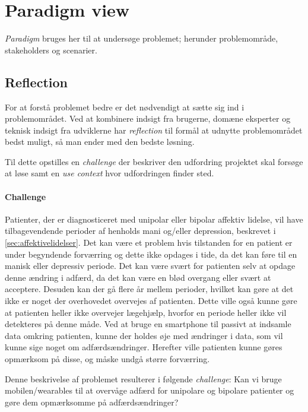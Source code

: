 

\section{Paradigm view}
\textit{Paradigm} bruges her til at undersøge problemet; herunder problemområde, stakeholders og scenarier.

\subsection{Reflection}
For at forstå problemet bedre er det nødvendigt at sætte sig ind i problemområdet.
Ved at kombinere indsigt fra brugerne, domæne eksperter og teknisk indsigt fra udviklerne har \emph{reflection} til formål at udnytte problemområdet bedst muligt, så man ender med den bedste løsning.

Til dette opstilles en \emph{challenge} der beskriver den udfordring projektet skal forsøge at løse samt en \emph{use context} hvor udfordringen finder sted.

\paragraph{Challenge}\label{paradigm:challenge}
Patienter, der er diagnosticeret med unipolar eller bipolar affektiv lidelse, vil have tilbagevendende perioder af henholds mani og/eller depression, beskrevet i \cref{sec:affektivelidelser}.
Det kan være et problem hvis tilstanden for en patient er under begyndende forværring og dette ikke opdages i tide, da det kan føre til en manisk eller depressiv periode.
Det kan være svært for patienten selv at opdage denne ændring i adfærd, da det kan være en blød overgang eller svært at acceptere.
Desuden kan der gå flere år mellem perioder, hvilket kan gøre at det ikke er noget der overhovedet overvejes af patienten.
Dette ville også kunne gøre at patienten heller ikke overvejer lægehjælp, hvorfor en periode heller ikke vil detekteres på denne måde.
Ved at bruge en smartphone til passivt at indsamle data omkring patienten, kunne der holdes øje med ændringer i data, som vil kunne sige noget om adfærdsændringer.
Herefter ville patienten kunne gøres opmærksom på disse, og måske undgå større forværring.

Denne beskrivelse af problemet resulterer i følgende \emph{challenge}:
Kan vi bruge mobilen/wearables til at overvåge adfærd for unipolare og bipolare patienter og gøre dem opmærksomme på adfærdsændringer?

